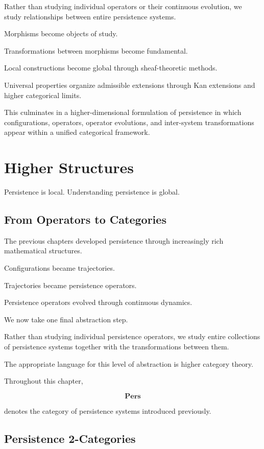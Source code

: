 \documentclass[11pt]{book}
\numberwithin{equation}{chapter}
\theoremstyle{definition}
\theoremstyle{plain}
\begin{document}
Rather than studying individual operators or their continuous
evolution, we study relationships between entire persistence systems.

Morphisms become objects of study.

Transformations between morphisms become fundamental.

Local constructions become global through sheaf-theoretic methods.

Universal properties organize admissible extensions through Kan
extensions and higher categorical limits.

This culminates in a higher-dimensional formulation of persistence in
which configurations, operators, operator evolutions, and
inter-system transformations appear within a unified categorical
framework.

\chapter{Higher Structures}

\epigraph{%
Persistence is local.
Understanding persistence is global.
}{}

\section{From Operators to Categories}

The previous chapters developed persistence through increasingly rich
mathematical structures.

Configurations became trajectories.

Trajectories became persistence operators.

Persistence operators evolved through continuous dynamics.

We now take one final abstraction step.

Rather than studying individual persistence operators, we study entire
collections of persistence systems together with the transformations
between them.

The appropriate language for this level of abstraction is higher
category theory.

Throughout this chapter,

\[
\mathbf{Pers}
\]

denotes the category of persistence systems introduced previously.

\section{Persistence 2-Categories}
\end{document}
